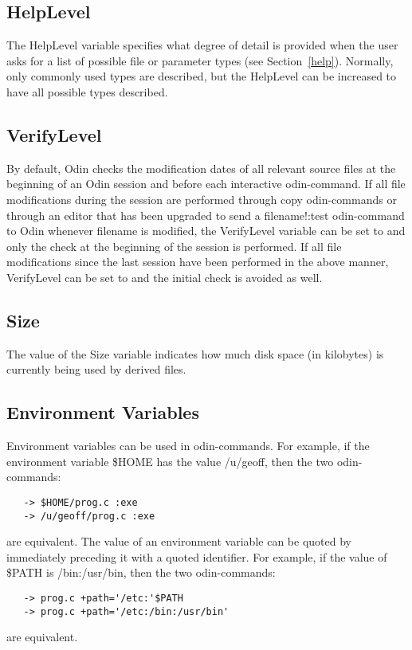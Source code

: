 \subsection{HelpLevel}
\label{helplevel}

The {\ex HelpLevel} variable specifies what degree of detail
is provided when the user asks for a list of possible
file or parameter types (see Section~\ref{help}).
Normally, only commonly used types are described, but the {\ex HelpLevel}
can be increased to have all possible types described.

\subsection{VerifyLevel}
\label{verifylevel}

By default, Odin checks the modification dates of all relevant source files
at the beginning of an Odin session and before each interactive odin-command.
If all file modifications during the session are performed through
copy odin-commands or through an editor that has been upgraded
to send a {\ex filename!:test} odin-command to Odin whenever {\ex filename}
is modified,
the {\ex VerifyLevel} variable can be set to {} and only the check
at the beginning of the session is performed.
If all file modifications since the last session have been performed
in the above manner,
{\ex VerifyLevel} can be set to {} and the initial check
is avoided as well.

\subsection{Size}

The value of the {\ex Size} variable indicates how much disk space
(in kilobytes) is currently being used by derived files.

\subsection{Environment Variables}
\label{envvar}

Environment variables can be used in odin-commands.
For example, if the environment variable {\ex \$HOME} has the value
{\ex /u/geoff}, then the two odin-commands:
\begin{verbatim}
   -> $HOME/prog.c :exe
   -> /u/geoff/prog.c :exe
\end{verbatim}
are equivalent.
The value of an environment variable can be quoted by immediately 
preceding it with a quoted identifier.
For example, if the value of {\ex \$PATH} is {\ex /bin:/usr/bin},
then the two odin-commands:
\begin{verbatim}
   -> prog.c +path='/etc:'$PATH
   -> prog.c +path='/etc:/bin:/usr/bin'
\end{verbatim}
are equivalent.

